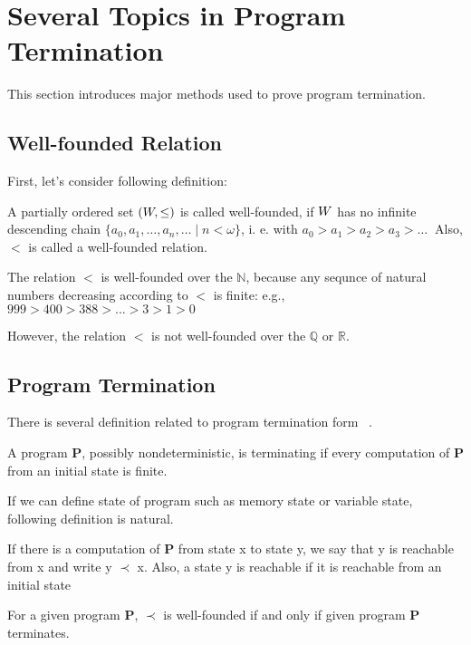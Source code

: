 \section{Several Topics in Program Termination}
This section introduces major methods used to prove program termination.
\label{sec:topics}
\subsection{Well-founded Relation}
First, let's consider following definition:~\cite{order}

\begin{definition}
    A partially ordered set $(\well, \leq)$ is called well-founded, 
    if $\well$ has no infinite descending chain $\{a_0, a_1, \dots, a_n, \dots \mid n < \omega\}$, i. e. with
    $a_0 > a_1 >a_2 > a_3 > \dots\ $ Also, $<$ is called a well-founded relation.
\end{definition}
\begin{example}
    The relation $<$ is well-founded over the $\mathbb{N}$, because any sequnce of natural numbers decreasing according to $<$ is finite: e.g.,\\
    $999 > 400 > 388 > ... > 3 > 1 > 0$
\end{example}
\begin{example}
    However, the relation $<$ is not well-founded over the $\mathbb{Q}$ or $\mathbb{R}$.
\end{example}
\subsection{Program Termination}
There is several definition related to program termination form ~\cite{term}.
\begin{definition}
    A program \textbf{P}, possibly nondeterministic, is terminating if every computation of \textbf{P} from an initial state is finite.
\end{definition}
If we can define state of program such as memory state or variable state, following definition is natural.
\begin{definition}
    If there is a computation of \textbf{P} from state x to state y, we say that y is reachable from x and write y $\prec$ x.
    Also, a state y is reachable if it is reachable from an initial state
\end{definition}
\begin{theorem}
    For a given program \textbf{P},
    $\prec$ is well-founded if and only if given program \textbf{P} terminates.
\end{theorem}

